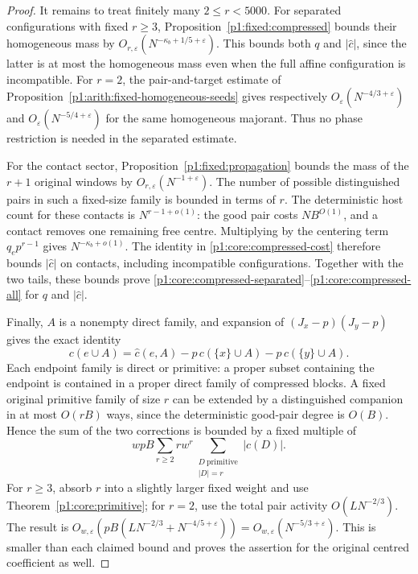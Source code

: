 \begin{proof}
It remains to treat finitely many $2\le r<5000$. For separated
configurations with fixed $r\ge3$,
Proposition~\ref{p1:fixed:compressed} bounds their homogeneous mass by
$O_{r,\varepsilon}(N^{-\kappa_b+1/5+\varepsilon})$.
This bounds both $q$ and $|\widehat c|$, since the latter is at most
the homogeneous mass even when the full affine configuration is
incompatible. For $r=2$, the pair-and-target estimate of
Proposition~\ref{p1:arith:fixed-homogeneous-seeds} gives respectively
$O_\varepsilon(N^{-4/3+\varepsilon})$ and
$O_\varepsilon(N^{-5/4+\varepsilon})$ for the same homogeneous
majorant. Thus no phase restriction is needed in the separated estimate.

For the contact sector, Proposition~\ref{p1:fixed:propagation} bounds the
mass of the $r+1$ original windows by $O_{r,\varepsilon}(N^{-1+\varepsilon})$.
The number of possible distinguished pairs in such a fixed-size
family is bounded in terms of $r$. The deterministic host count for
these contacts is $N^{r-1+o(1)}$: the good pair costs $NB^{O(1)}$,
and a contact removes one remaining free centre. Multiplying by the
centering term $q_ep^{r-1}$ gives $N^{-\kappa_b+o(1)}$.
The identity in \eqref{p1:core:compressed-cost} therefore bounds
$|\widehat c|$ on contacts, including incompatible configurations.
Together with the two tails, these bounds prove
\eqref{p1:core:compressed-separated}--\eqref{p1:core:compressed-all}
for $q$ and $|\widehat c|$.

Finally, $A$ is a nonempty direct family, and expansion of
$(J_x-p)(J_y-p)$ gives the exact identity
\begin{equation}
 c(e\cup A)=\widehat c(e,A)
                -p\,c(\{x\}\cup A)-p\,c(\{y\}\cup A).
 \label{p1:core:centering-change}
\end{equation}
Each endpoint family is direct or primitive: a proper subset
containing the endpoint is contained in a proper direct family of
compressed blocks. A fixed original primitive family of size $r$
can be extended by a distinguished companion in at most $O(rB)$ ways,
since the deterministic good-pair degree is $O(B)$. Hence the sum of
the two corrections is bounded by a fixed multiple of
\[
 wpB\sum_{r\ge2}r w^r
             \sum_{\substack{D\ \mathrm{primitive}\\|D|=r}}|c(D)|.
\]
For $r\ge3$, absorb $r$ into a slightly larger fixed weight and use
Theorem~\ref{p1:core:primitive}; for $r=2$, use the total pair activity
$O(LN^{-2/3})$. The result is
$O_{w,\varepsilon}(pB(LN^{-2/3}+N^{-4/5+\varepsilon}))
 =O_{w,\varepsilon}(N^{-5/3+\varepsilon})$.
This is smaller than each claimed bound and proves the assertion for
the original centred coefficient as well.
\end{proof}

